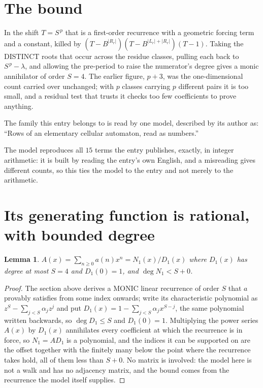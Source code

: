 \documentclass[11pt,a4paper]{article}
\theoremstyle{plain}
\newtheorem{lemma}[theorem]{Lemma}
\theoremstyle{definition}
\begin{document}
\section{The bound}

In the shift $T=S^{\,p}$ that is a first-order recurrence with a geometric forcing term and a
constant, killed by $(T-B^{|R_r|})(T-B^{|L_r|+|R_r|})(T-1)$. Taking the DISTINCT roots that
occur across the residue classes, pulling each back to $S^{\,p}-\lambda$, and allowing the
pre-period to raise the numerator's degree gives a monic annihilator of order $S=4$. The
earlier figure, $p+3$, was the one-dimensional count carried over unchanged; with $p$ classes
carrying $p$ different pairs it is too small, and a residual test that trusts it checks too few
coefficients to prove anything.

The family this entry belongs to is read by one model, described by its author as: ``Rows of an elementary cellular automaton, read as numbers.''


The model reproduces all $15$ terms the entry publishes, exactly, in integer arithmetic:
it is built by reading the entry's own English, and a misreading gives different counts, so
this ties the model to the entry and not merely to the arithmetic.

\section{Its generating function is rational, with bounded degree}

\begin{lemma}\label{lem:rat}
$A(x)=\sum_{n\ge0}a(n)x^n=N_1(x)/D_1(x)$ where $D_1(x)$ has degree at most $S=4$ and
$D_1(0)=1$, and $\deg N_1<S+0$.
\end{lemma}

\begin{proof}
The section above derives a MONIC linear recurrence of order $S$ that $a$ provably satisfies
from some index onwards; write its characteristic polynomial as $z^S-\sum_{j<S}\alpha_jz^j$
and put $D_1(x)=1-\sum_{j<S}\alpha_jx^{S-j}$, the same polynomial written backwards, so
$\deg D_1\le S$ and $D_1(0)=1$. Multiplying the power series $A(x)$ by $D_1(x)$ annihilates
every coefficient at which the recurrence is in force, so $N_1=AD_1$ is a polynomial, and the
indices it can be supported on are the offset together with the finitely many below the point
where the recurrence takes hold, all of them less than $S+0$. No matrix is involved: the
model here is not a walk and has no adjacency matrix, and the bound comes from the recurrence
the model itself supplies.
\end{proof}
\end{document}

